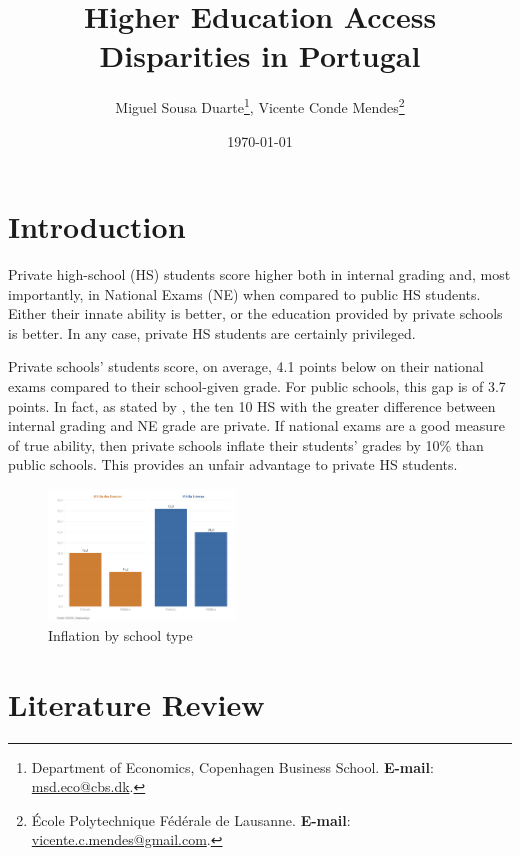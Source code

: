 \documentclass{article}
\begin{document}
\title{Higher Education Access Disparities in Portugal}
\author{Miguel Sousa Duarte\thanks{{\tiny{}Department of Economics, Copenhagen Business School. \textbf{E-mail}: \url{msd.eco@cbs.dk}.}},
Vicente Conde Mendes\thanks{{\tiny{}École Polytechnique Fédérale de Lausanne. \textbf{E-mail}: \url{vicente.c.mendes@gmail.com}.}}\\}

\date{\today}


\setlength{\parskip}{1em}
\maketitle

\section{Introduction}

Private high-school (HS) students score higher both in internal grading and, most importantly, in National Exams (NE) when compared to public HS students. Either their innate ability is better, or the education provided by private schools is better. In any case, private HS students are certainly privileged. 

Private schools' students score, on average, 4.1 points below on their national exams compared to their school-given grade. For public schools, this gap is of 3.7 points. In fact, as stated by \cite{sapo2024}, the ten 10 HS with the greater difference between internal grading and NE grade are private.
If national exams are a good measure of true ability, then private schools inflate their students' grades by 10\% than public schools. This provides an unfair advantage to private HS students.

\begin{figure}[ht]
  \centering
  \includegraphics[height=3.5cm, keepaspectratio]{Figures/InflationBySchoolType.png}
  \caption{Inflation by school type}
  \label{fig: InflationBySchoolType}
\end{figure}

\section{Literature Review}
\end{document}
